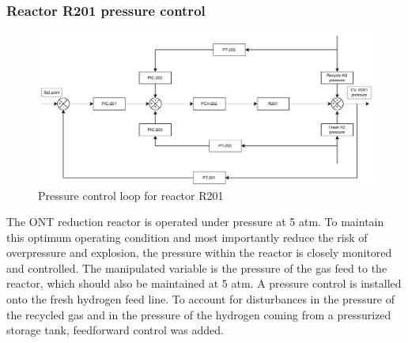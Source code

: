 \subsubsection{Reactor R201 pressure control} %
\begin{figure}
    \centering
    \includegraphics[width=\linewidth]{chapters/4-operation-control/4-Figures/R201-PC.pdf}
    \caption{Pressure control loop for reactor R201}
    \label{fig:R201-PC}
\end{figure}
The ONT reduction reactor is operated under pressure at 5 atm. To maintain this optimum operating condition and most importantly reduce the risk of overpressure and explosion, the pressure within the reactor is closely monitored and controlled. The manipulated variable is the pressure of the gas feed to the reactor, which should also be maintained at 5 atm. A pressure control is installed onto the fresh hydrogen feed line. To account for disturbances in the pressure of the recycled gas and in the pressure of the hydrogen coming from a pressurized storage tank, feedforward control was added. 



